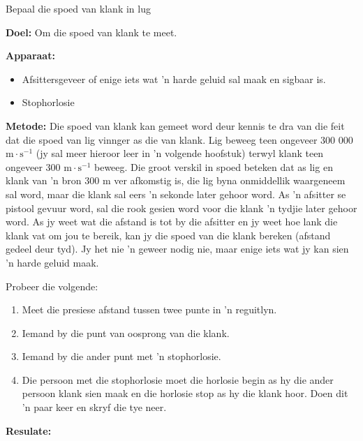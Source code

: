 \vspace*{-0.5cm}
\begin{i_experiment}{Bepaal die spoed van klank in lug}

\textbf{Doel:} Om die spoed van klank te meet.

\textbf{Apparaat:} 
\begin{itemize}
 \item Afsittersgeveer of enige iets wat  'n harde geluid sal maak en sigbaar is. 
  \item Stophorlosie
  \end{itemize}

\textbf{Metode:}
Die spoed van klank kan gemeet word deur kennis te dra van die feit dat die spoed van lig vinnger as die van klank. Lig beweeg teen ongeveer 300 000 $\text{m}\cdot\text{s}^{-1}$ (jy sal meer hieroor leer in  'n volgende hoofstuk) terwyl klank teen ongeveer 300 $\text{m}\cdot\text{s}^{-1}$ beweeg. Die groot verskil in spoed beteken dat as lig en klank van  'n bron 300 $\text{m}$ ver afkomstig is, die lig byna onmiddellik waargeneem sal word, maar die klank sal eers  'n sekonde later gehoor word. As  'n afsitter se pistool gevuur word, sal die rook gesien word voor die klank  'n tydjie later gehoor word. As jy weet wat die afstand is tot by die afsitter en jy weet hoe lank die klank vat om jou te bereik,  kan jy die spoed van die klank bereken (afstand gedeel deur tyd). Jy het nie  'n geweer nodig nie, maar enige iets wat jy kan sien  'n harde geluid maak.    


Probeer die volgende:
\begin{enumerate}[noitemsep, label=\textbf{\arabic*}. ] 
\item Meet die presiese afstand tussen twee punte in  'n reguitlyn.
\item Iemand by die punt van oosprong van die klank.
\item Iemand by die ander punt met  'n stophorlosie.
\item Die persoon met die stophorlosie moet die horlosie begin as hy die ander persoon klank sien maak en die horlosie stop as hy die klank hoor. Doen dit  'n paar keer en skryf die tye neer. 

\end{enumerate}

\textbf{Resulate:}


\end{i_experiment}
